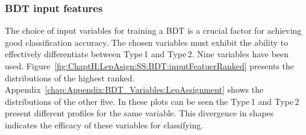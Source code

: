  
\subsubsection{BDT input features}
\label{sec:ChaptH:Sig:LepAsign:SS:BDT:inputFeatues}
The choice of input variables for training a BDT is a crucial factor for achieving good classification accuracy.
The chosen variables must exhibit the ability to effectively differentiate between Type$\,$1 and Type$\,$2. 
Nine variables have been used. Figure~\ref{fig:ChaptH:LepAsign:SS:BDT:inputFeatuerRanked} presents
the distributions of the highest ranked.
Appendix~\ref{chap:Appendix:BDT_Variables:LepAssignment} shows
the distributions of the other five. In these plots can be seen 
the Type$\,$1 and Type$\,$2 present different profiles for the same variable.
This divergence in shapes indicates the efficacy of these variables for classifying.

